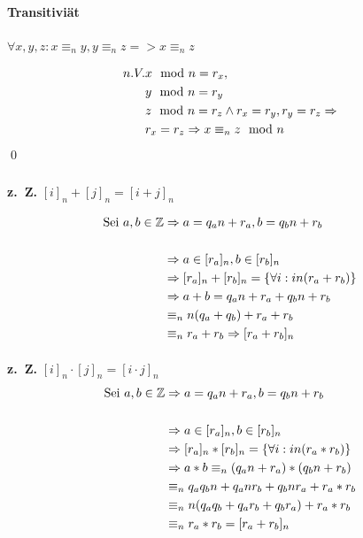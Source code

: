 \paragraph{Transitiviät}
\hspace{1cm} $ \forall x,y,z: x \equiv_n y , y \equiv_n z => x \equiv_n z $

\begin{align*}
	n. V. & x \mod n = r_x,  										 \\
          & y \mod n = r_y  			   					     		 \\
          & z \mod n = r_z 										
           \wedge r_x = r_y , r_y=r_z \Rightarrow                           \\
		  & r_x = r_z \Rightarrow x \equiv_n z \mod n
\end{align*}
\qed

\subsubsection{}
\paragraph{} 
\hspace{1cm} \textbf{z.~Z.} $ [i]_n + [j]_n = [i+j]_n$

\begin{align*}
\text{Sei } a,b \in \mathbb{Z} &\Rightarrow a = q_an+r_a , b = q_bn+r_b    			 \\ \\
				 &\Rightarrow  a \in [r_a]_n , b \in  [r_b]_n  			     \\
				 &\Rightarrow [r_a]_n + [r_b]_n = \{ \forall i: in(r_a+r_b) \}	 \\
				 &\Rightarrow a + b =  q_an+r_a + q_bn+r_b                      \\
				 & \equiv_n   n(q_a+q_b)+r_a+r_b                   \\
				 & \equiv_n r_a+r_b  \Rightarrow [r_a+r_b]_n
\end{align*}

\paragraph{} 
\hspace{1cm} \textbf{z.~Z.} $ [i]_n \cdot [j]_n = [i \cdot j]_n$
\begin{align*}
\text{Sei } a,b \in \mathbb{Z} & \Rightarrow a = q_an+r_a , b = q_bn+r_b    			 \\ \\
				 &\Rightarrow  a \in [r_a]_n , b \in  [r_b]_n  			     \\
				 &\Rightarrow [r_a]_n * [r_b]_n = \{ \forall i: in(r_a*r_b) \}	 \\
				 &\Rightarrow a * b \equiv_n  (q_an+r_a) * (q_bn+r_b)                  \\
				 & \equiv_n  q_aq_bn+q_anr_b+q_bnr_a+r_a*r_b                   \\
				 & \equiv_n  n(q_aq_b+q_ar_b+q_br_a)+r_a*r_b                   \\				 
				 & \equiv_n r_a*r_b  =  [r_a+r_b]_n
\end{align*}

